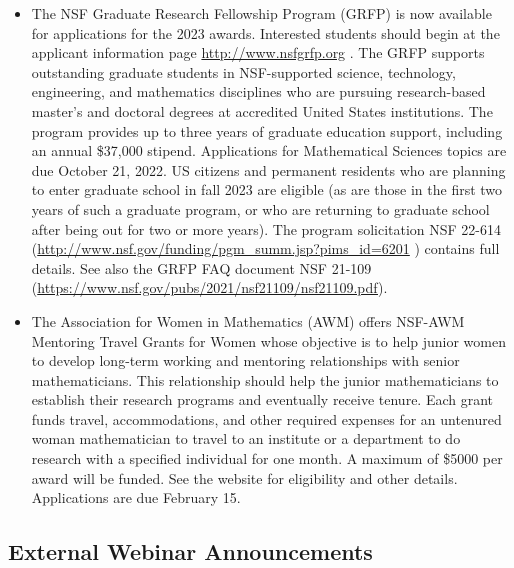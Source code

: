 \documentclass[
  letterpaper,
  DIV=11,
  numbers=noendperiod,
  oneside]{scrartcl}
\providecommand{\tightlist}{%
  \setlength{\itemsep}{0pt}\setlength{\parskip}{0pt}}\usepackage{longtable,booktabs,array}
\begin{document}
\begin{itemize}
\tightlist
\item
  The NSF Graduate Research Fellowship Program (GRFP) is now available
  for applications for the 2023 awards. Interested students should begin
  at the applicant information page \url{http://www.nsfgrfp.org} . The
  GRFP supports outstanding graduate students in NSF-supported science,
  technology, engineering, and mathematics disciplines who are pursuing
  research-based master's and doctoral degrees at accredited United
  States institutions. The program provides up to three years of
  graduate education support, including an annual \$37,000 stipend.
  Applications for Mathematical Sciences topics are due October 21,
  2022. US citizens and permanent residents who are planning to enter
  graduate school in fall 2023 are eligible (as are those in the first
  two years of such a graduate program, or who are returning to graduate
  school after being out for two or more years). The program
  solicitation NSF 22-614
  (\url{http://www.nsf.gov/funding/pgm_summ.jsp?pims_id=6201} ) contains
  full details. See also the GRFP FAQ document NSF 21-109
  (\url{https://www.nsf.gov/pubs/2021/nsf21109/nsf21109.pdf}).
\item
  The Association for Women in Mathematics (AWM) offers NSF-AWM
  Mentoring Travel Grants for Women whose objective is to help junior
  women to develop long-term working and mentoring relationships with
  senior mathematicians. This relationship should help the junior
  mathematicians to establish their research programs and eventually
  receive tenure. Each grant funds travel, accommodations, and other
  required expenses for an untenured woman mathematician to travel to an
  institute or a department to do research with a specified individual
  for one month. A maximum of \$5000 per award will be funded. See the
  website for eligibility and other details. Applications are due
  February 15.
\end{itemize}

\hypertarget{external-webinar-announcements}{%
\subsection{External Webinar
Announcements}\label{external-webinar-announcements}}
\end{document}
